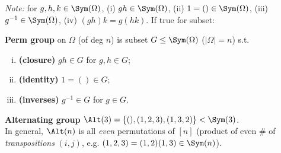 \begin{slide}
    \textit{Note:} for $g,h,k \in \Sym(\Omega)$, (i) $gh \in \Sym(\Omega)$, (ii) $1 = () \in \Sym(\Omega)$, (iii) $g^{-1} \in \Sym(\Omega)$, (iv) $(gh)k = g(hk)$. If true for subset: \pause

    \begin{definition}
        \vspace{0pt}
        \textbf{Perm group} on $\Omega$ (of deg $n$) is subset $G \leq \Sym(\Omega)$ ($|\Omega| = n$) s.t.
        \begin{enumerate}[(i)]
            \item \textbf{(closure)} $gh \in G$ for $g,h \in G$; \pause
            \item \textbf{(identity)} $1 = () \in G$; \pause
            \item \textbf{(inverses)} $g^{-1} \in G$ for $g \in G$.
        \end{enumerate}
    \end{definition} \pause

    \begin{example}
        \vspace{0pt}
        \textbf{Alternating group} $\Alt(3) = \{(),(1,2,3),(1,3,2)\} < \Sym(3)$. \pause \\
        In general, $\Alt(n)$ is all \textit{even} permutations of $[n]$ (product of even \# of \textit{transpositions} $(i,j)$, e.g. $(1,2,3) = (1,2)(1,3) \in \Sym(n)$).
    \end{example}
\end{slide}



